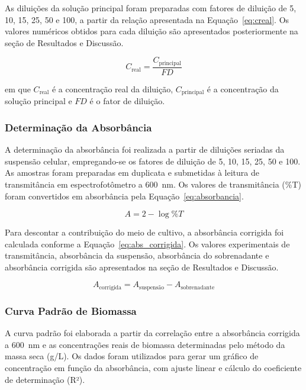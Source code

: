 As diluições da solução principal foram preparadas com fatores de diluição de 5, 10, 15, 25, 50 e 100, a partir da relação apresentada na Equação~\ref{eq:creal}. Os valores numéricos obtidos para cada diluição são apresentados posteriormente na seção de Resultados e Discussão.

\begin{equation}
    C_{\text{real}} = \frac{C_{\text{principal}}}{FD}
    \label{eq:creal}
\end{equation}

em que $C_{\text{real}}$ é a concentração real da diluição, $C_{\text{principal}}$ é a concentração da solução principal e $FD$ é o fator de diluição.

\subsubsection{Determinação da Absorbância}

A determinação da absorbância foi realizada a partir de diluições seriadas da suspensão celular, empregando-se os fatores de diluição de 5, 10, 15, 25, 50 e 100. As amostras foram preparadas em duplicata e submetidas à leitura de transmitância em espectrofotômetro a 600~nm. Os valores de transmitância (\%T) foram convertidos em absorbância pela Equação~\ref{eq:absorbancia}.

\begin{equation}
    A = 2 - \log \%T
    \label{eq:absorbancia}
\end{equation}

Para descontar a contribuição do meio de cultivo, a absorbância corrigida foi calculada conforme a Equação~\ref{eq:abs_corrigida}. Os valores experimentais de transmitância, absorbância da suspensão, absorbância do sobrenadante e absorbância corrigida são apresentados na seção de Resultados e Discussão.

\begin{equation}
    A_{\text{corrigida}} = A_{\text{suspensão}} - A_{\text{sobrenadante}}
    \label{eq:abs_corrigida}
\end{equation}

\subsubsection{Curva Padrão de Biomassa}

A curva padrão foi elaborada a partir da correlação entre a absorbância corrigida a 600~nm e as concentrações reais de biomassa determinadas pelo método da massa seca (g/L). Os dados foram utilizados para gerar um gráfico de concentração em função da absorbância, com ajuste linear e cálculo do coeficiente de determinação (R²).
